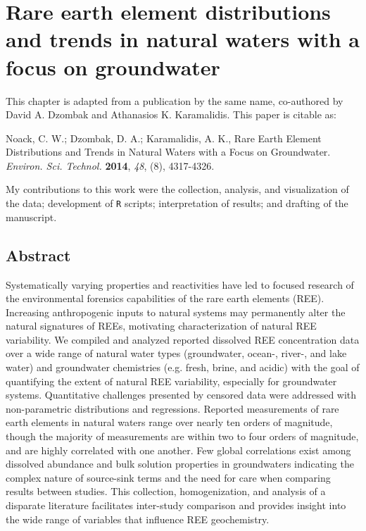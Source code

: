 \chapter{Rare earth element distributions and trends in natural waters with a focus on groundwater}\label{chap:REE-review}

This chapter is adapted from a publication by the same name, co-authored by David A. Dzombak and Athanasios K. Karamalidis.
This paper is citable as: 

Noack, C. W.; Dzombak, D. A.; Karamalidis, A. K., Rare Earth Element Distributions and Trends in Natural Waters with a Focus on Groundwater. \textit{Environ. Sci. Technol.} \textbf{2014}, \textit{48}, (8), 4317-4326.

My contributions to this work were the collection, analysis, and visualization of the data; development of \texttt{R} scripts; interpretation of results; and drafting of the manuscript.

\clearpage

\section*{Abstract}
Systematically varying properties and reactivities have led to focused research of the environmental forensics capabilities of the rare earth elements (REE).
Increasing anthropogenic inputs to natural systems may permanently alter the natural signatures of REEs, motivating characterization of natural REE variability.
We compiled and analyzed reported dissolved REE concentration data over a wide range of natural water types (groundwater, ocean-, river-, and lake water) and groundwater chemistries (e.g. fresh, brine, and acidic) with the goal of quantifying the extent of natural REE variability, especially for groundwater systems.
Quantitative challenges presented by censored data were addressed with non-parametric distributions and regressions.
Reported measurements of rare earth elements in natural waters range over nearly ten orders of magnitude, though the majority of measurements are within two to four orders of magnitude, and are highly correlated with one another.
Few global correlations exist among dissolved abundance and bulk solution properties in groundwaters indicating the complex nature of source-sink terms and the need for care when comparing results between studies.
This collection, homogenization, and analysis of a disparate literature facilitates inter-study comparison and provides insight into the wide range of variables that influence REE geochemistry.


